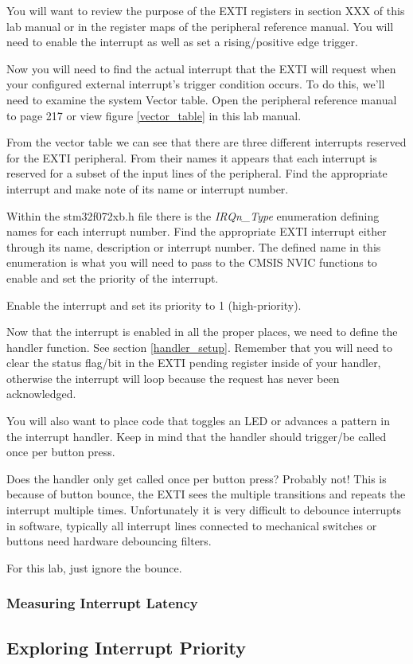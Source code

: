 \documentclass[11pt,fleqn]{book} %
\begin{document}
You will want to review the purpose of the EXTI registers in section XXX of this lab manual or in the register maps of the peripheral reference manual. You will need to enable the interrupt as well as set a rising/positive edge trigger. 


Now you will need to find the actual interrupt that the EXTI will request when your configured external interrupt's trigger condition occurs. To do this, we'll need to examine the system Vector table. Open the peripheral reference manual to page 217 or view figure \ref{vector_table} in this lab manual. 

From the vector table we can see that there are three different interrupts reserved for the EXTI peripheral. From their names it appears that each interrupt is reserved for a subset of the input lines of the peripheral. Find the appropriate interrupt and make note of its name or interrupt number. 

Within the stm32f072xb.h file there is the \textit{IRQn\_Type} enumeration defining names for each interrupt number. Find the appropriate EXTI interrupt either through its name, description or interrupt number. The defined name in this enumeration is what you will need to pass to the CMSIS NVIC functions to enable and set the priority of the interrupt. 

Enable the interrupt and set its priority to 1 (high-priority).


Now that the interrupt is enabled in all the proper places, we need to define the handler function. See section \ref{handler_setup}. Remember that you will need to clear the status flag/bit in the EXTI pending register inside of your handler, otherwise the interrupt will loop because the request has never been acknowledged. 

You will also want to place code that toggles an LED or advances a pattern in the interrupt handler. Keep in mind that the handler should trigger/be called once per button press. 


Does the handler only get called once per button press? Probably not! This is because of button bounce, the EXTI sees the multiple transitions and repeats the interrupt multiple times. Unfortunately it is very difficult to debounce interrupts in software, typically all interrupt lines connected to mechanical switches or buttons need hardware debouncing filters.

For this lab, just ignore the bounce.

\subsubsection{Measuring Interrupt Latency}

\subsection{Exploring Interrupt Priority}
\end{document}
